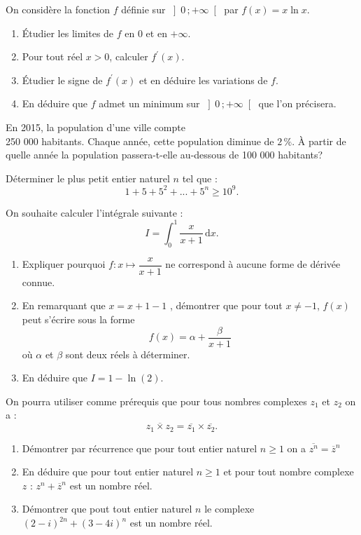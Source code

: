 \begin{question}[topic=logarithme]
  On considère la fonction $f$ définie sur $ \left] 0 \, ;+\infty \right[ $
  par $f(x)=x \ln x$.
  \begin{enumerate}
    \item Étudier les limites de $f$ en 0 et en $+\infty$.
    \item Pour tout réel $x>0$, calculer $f^{\prime}(x)$.
    \item Étudier le signe de  $f^{\prime}(x)$ et en déduire les variations
      de $f$.
    \item En déduire que $f$ admet un minimum sur $\left] 0 \,
      ;+\infty\right[ $ que l'on précisera.
\end{enumerate}
\end{question}

\begin{question}[topic=logarithme]
  En 2015, la population d'une ville compte \\250 000 habitants. Chaque
  année, cette population diminue de $2 \, \%$. À partir de quelle année la
  population passera-t-elle au-dessous de 100 000 habitants?
\end{question}

\begin{question}[topic=logarithme]
  Déterminer le plus petit entier naturel $n$ tel que :
  \[ 1+5+5^2+...+5^n \geqslant 10^9. \]
\end{question}

\begin{question}[topic=integration]
  On souhaite calculer l'intégrale suivante :
  \[ I = \int_0^1 \dfrac{x}{x+1}\,\mathrm{d}x. \]
  \begin{enumerate}
    \item Expliquer pourquoi $f : x \mapsto \dfrac{x}{x+1}$ ne correspond à
      aucune forme de dérivée connue.
    \item En remarquant que $x = x + 1 - 1$ , démontrer que pour tout $x
      \neq -1$, $f(x)$ peut s'écrire sous la forme \[f(x) = \alpha+
      \dfrac{\beta}{x+1}\] où $\alpha$ et $\beta$ sont deux réels à
      déterminer.
    \item En déduire que $I = 1 - \ln(2)$.
  \end{enumerate}
\end{question}

\begin{question}[topic=complexes]
  On pourra utiliser comme prérequis que pour tous nombres complexes $z_1$
  et $z_2$ on a : $$\overline{z_1\times z_2}=\overline{z_1}\times
  \overline{z_2}.$$
  \begin{enumerate}
    \item Démontrer par récurrence que pour tout entier naturel $n\geqslant
      1$ on a $\overline{z^n}=\overline{z}^n$
    \item En déduire que pour tout entier naturel $n\geqslant 1$ et pour
      tout nombre complexe $z$ : $z^n+\overline{z}^n$ est un nombre réel.
    \item Démontrer que pout tout entier naturel $n$ le complexe
      $(2-i)^{2n}+(3-4i)^n$ est un nombre réel.
  \end{enumerate}
\end{question}

